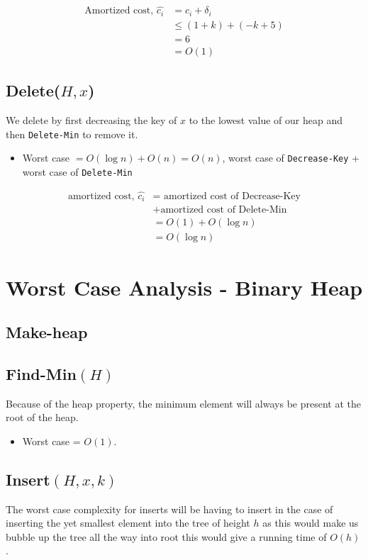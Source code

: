 \documentclass[a4paper,oneside,11pt]{article}
\begin{document}
\begin{align*}
  \text{Amortized cost, }\hat{c_i} &= c_i + \delta_i\\
  &\leq (1+k)+(-k+5)\\
  &= 6\\
  &= O(1)
\end{align*}
\subsection*{Delete($H, x$)}
We delete by first decreasing the key of $x$ to the lowest value of our heap and then \texttt{Delete-Min} to remove it.

\begin{itemize}
\item{Worst case} $= O(\log n) + O(n) = O(n)$, worst case of \texttt{Decrease-Key} + worst case of \texttt{Delete-Min}
\end{itemize}

\begin{align*}
\text{amortized cost, } \hat{c_i} &= \text{ amortized cost of Decrease-Key}\\
&+\text{amortized cost of Delete-Min}\\
&= O(1) + O(\log n)\\
&= O(\log n)
\end{align*}

\section*{Worst Case Analysis - Binary Heap}
\subsection*{Make-heap}


\subsection*{Find-Min$(H)$}
Because of the heap property, the minimum element will always be present at the root of the heap.

\begin{itemize}
\item{Worst case} = $O(1)$.
\end{itemize}

\subsection*{Insert$(H,x,k)$}
The worst case complexity for inserts will be having to insert in the case of inserting the yet smallest element into the tree of height $h$ as this would make us bubble up the tree all the way into root this would give a running time of $O(h)$.
\end{document}
